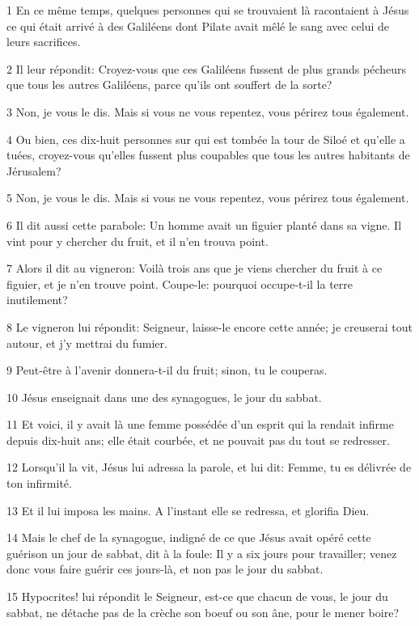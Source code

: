 \par 1 En ce même temps, quelques personnes qui se trouvaient là racontaient à Jésus ce qui était arrivé à des Galiléens dont Pilate avait mêlé le sang avec celui de leurs sacrifices.
\par 2 Il leur répondit: Croyez-vous que ces Galiléens fussent de plus grands pécheurs que tous les autres Galiléens, parce qu'ils ont souffert de la sorte?
\par 3 Non, je vous le dis. Mais si vous ne vous repentez, vous périrez tous également.
\par 4 Ou bien, ces dix-huit personnes sur qui est tombée la tour de Siloé et qu'elle a tuées, croyez-vous qu'elles fussent plus coupables que tous les autres habitants de Jérusalem?
\par 5 Non, je vous le dis. Mais si vous ne vous repentez, vous périrez tous également.
\par 6 Il dit aussi cette parabole: Un homme avait un figuier planté dans sa vigne. Il vint pour y chercher du fruit, et il n'en trouva point.
\par 7 Alors il dit au vigneron: Voilà trois ans que je viens chercher du fruit à ce figuier, et je n'en trouve point. Coupe-le: pourquoi occupe-t-il la terre inutilement?
\par 8 Le vigneron lui répondit: Seigneur, laisse-le encore cette année; je creuserai tout autour, et j'y mettrai du fumier.
\par 9 Peut-être à l'avenir donnera-t-il du fruit; sinon, tu le couperas.
\par 10 Jésus enseignait dans une des synagogues, le jour du sabbat.
\par 11 Et voici, il y avait là une femme possédée d'un esprit qui la rendait infirme depuis dix-huit ans; elle était courbée, et ne pouvait pas du tout se redresser.
\par 12 Lorsqu'il la vit, Jésus lui adressa la parole, et lui dit: Femme, tu es délivrée de ton infirmité.
\par 13 Et il lui imposa les mains. A l'instant elle se redressa, et glorifia Dieu.
\par 14 Mais le chef de la synagogue, indigné de ce que Jésus avait opéré cette guérison un jour de sabbat, dit à la foule: Il y a six jours pour travailler; venez donc vous faire guérir ces jours-là, et non pas le jour du sabbat.
\par 15 Hypocrites! lui répondit le Seigneur, est-ce que chacun de vous, le jour du sabbat, ne détache pas de la crèche son boeuf ou son âne, pour le mener boire?
